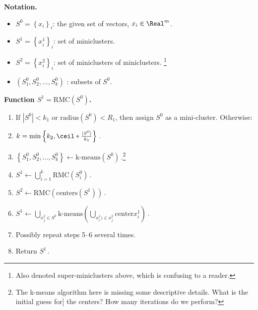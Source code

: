 \documentclass{article} %
\begin{document}
{\bf Notation.}
\begin{itemize}
    \item $S^0 = \left\{x_i\right\}_i$: the given set of vectors, $x_i \in \Real^m$.
    \item $S^1 = \left\{x_i^1\right\}_i$: set of miniclusters.
    \item $S^2 = \left\{x_i^2\right\}_i$: set of miniclusters of miniclusters. \footnote{Also denoted super-miniclusters above, which is confusing to a reader.}
    \item $(S^0_1,S^0_2,\dots,S^0_k)$ : subsets of $S^0$.
\end{itemize}

{\bf Function $S^1 = \text{RMC}(S^0)$.}
\begin{enumerate}
    \item If $|S^0| < k_1$ or $\text{radius}(S^0) < R_1$, then assign $S^0$ as  a mini-cluster. Otherwise:
    \item $k = \min\left\{k_2, \ceil*{\frac{|S^0|}{k_1}} \right\}\,.$
    \item $\left\{S^0_1,S^0_2,\dots,S^0_k\right\} \longleftarrow \text{k-means}\left(S^0\right)\,.$\footnote{The k-means algorithm here is missing some descriptive details. What is the initial guess for] the centers? How many iterations do we perform?}
    \item $S^1 \longleftarrow \bigcup_{i=1}^k \text{RMC}\left(S^0_i\right)\,.$
    \item $S^2 \longleftarrow \text{RMC}\left(\text{centers}\left(S^1\right)\right)\,.$
    \item $S^1 \longleftarrow \bigcup_{x_j^2 \in S^2} \text{k-means}\left(\bigcup_{x_i^1) \in x^2_j} \text{center}x_i^1 \right)\,.$
    \item Possibly repeat steps 5--6 several times.
    \item Return $S^1$\,.
\end{enumerate}
\end{document}
